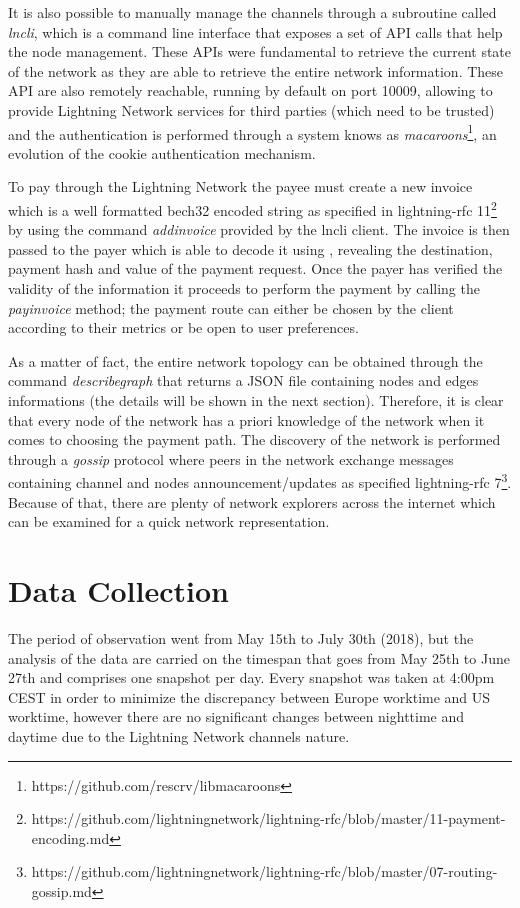 	It is also possible to manually manage the channels through a subroutine called \textit{lncli}, which is a command line interface that exposes a set of API calls that help the node management. These APIs were fundamental to retrieve the current state of the network as they are able to retrieve the entire network information. These API are also remotely reachable, running by default on port 10009, allowing to provide Lightning Network services for third parties (which need to be trusted) and the authentication is performed through a system knows as \textit{macaroons}\footnote{https://github.com/rescrv/libmacaroons}, an evolution of the cookie authentication mechanism. 
	
	To pay through the Lightning Network the payee must create a new invoice which is a well formatted bech32 encoded string as specified in lightning-rfc 11\footnote{https://github.com/lightningnetwork/lightning-rfc/blob/master/11-payment-encoding.md} by using the command \textit{addinvoice} provided by the lncli client. The invoice is then passed to the payer which is able to decode it using , revealing the destination, payment hash and value of the payment request. Once the payer has verified the validity of the information it proceeds to perform the payment by calling the \textit{payinvoice} method; the payment route can either be chosen by the client according to their metrics or be open to user preferences.	
	
	As a matter of fact, the entire network topology can be obtained through the command \textit{describegraph} that returns a JSON file containing nodes and edges informations (the details will be shown in the next section). Therefore, it is clear that every node of the network has a priori knowledge of the network when it comes to choosing the payment path. The discovery of the network is performed through a \textit{gossip} protocol where peers in the network exchange messages containing channel and nodes announcement/updates as specified lightning-rfc 7\footnote{https://github.com/lightningnetwork/lightning-rfc/blob/master/07-routing-gossip.md}. Because of that, there are plenty of network explorers across the internet which can be examined for a quick network representation.
	
	\section{Data Collection}
	
	The period of observation went from May 15th to July 30th (2018), but the analysis of the data are carried on the timespan that goes from May 25th to June 27th and comprises one snapshot per day. Every snapshot was taken at 4:00pm CEST in order to minimize the discrepancy between Europe worktime and US worktime, however there are no significant changes between nighttime and daytime due to the Lightning Network channels nature. 
	
